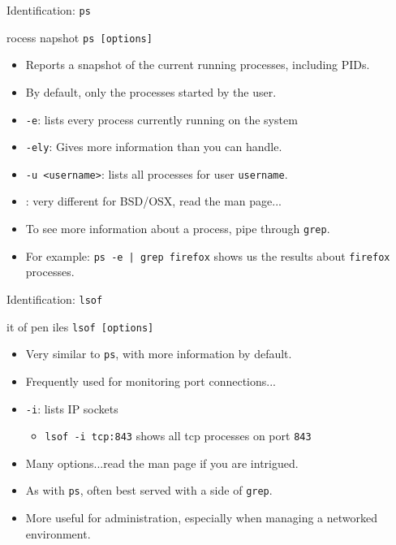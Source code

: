 \begin{frame}[fragile]{Identification: \texttt{ps}}
  \begin{block}{rocess napshot}
    \texttt{ps [options]}
    \begin{itemize}
      \item Reports a snapshot of the current running processes, including PIDs.
      \item By default, only the processes started by the user.
      \item \texttt{-e}: lists every process currently running on the system
      \item \texttt{-ely}: Gives more information than you can handle.
      \item \texttt{-u <username>}: lists all processes for user \texttt{username}.
      \item {}: very different for BSD/OSX, read the man page...
    \end{itemize}
  \end{block}
  \vspace*{-2ex}
  \begin{itemize}[<+- | alert@+>]
    \item To see more information about a process, pipe through \texttt{grep}.
    \item For example: \texttt{ps -e | grep firefox} shows us the results about \texttt{firefox} processes.
  \end{itemize}
\end{frame}

\begin{frame}[fragile]{Identification: \texttt{lsof}}
  \begin{block}{it of pen iles}
    \texttt{lsof [options]}
    \begin{itemize}
      \item Very similar to \texttt{ps}, with more information by default.
      \item Frequently used for monitoring port connections...
      \item \texttt{-i}: lists IP sockets
      \begin{itemize}
        \item \texttt{lsof -i tcp:843} shows all tcp processes on port \texttt{843}
      \end{itemize}
      \item Many options...read the man page if you are intrigued.
    \end{itemize}
  \end{block}
  \begin{itemize}[<+- | alert@+>]
    \item As with \texttt{ps}, often best served with a side of \texttt{grep}.
    \item More useful for administration, especially when managing a networked environment.
  \end{itemize}
\end{frame}

